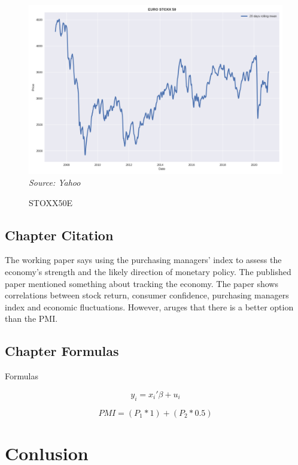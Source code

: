 \documentclass[12pt,a4paper]{article}
\begin{document}
\begin{figure}[h!]
\caption{STOXX50E}
\centering
\label{figure1}
\includegraphics[width=13cm]{STOXX50E.png}
{\it Source: Yahoo}
\end{figure}

\subsection{Chapter Citation}

The working paper \cite{Koenig2002} says using the purchasing managers’ index to assess the economy’s strength and the likely direction of monetary policy.
The published paper \cite{Harris1991} mentioned something about tracking the economy.
The paper \cite{Afshar2007} shows correlations between stock return, consumer confidence, purchasing managers index and economic fluctuations. 
However,\cite{Pelaez2003} aruges that there is a better option than the PMI. 


 \subsection{Chapter Formulas}
 
Formulas 

\begin{equation}
y_i = x_i'\beta + u_i
\end{equation}

\begin{equation}
PMI =(P_{1}*1)+(P_{2}*0.5)
\end{equation}

\section{Conlusion}
\end{document}
